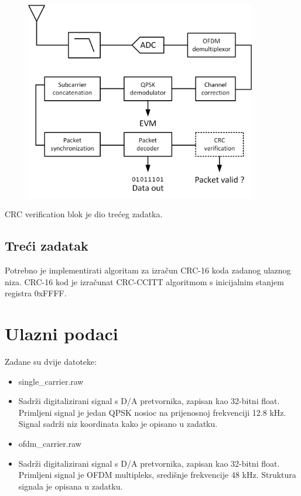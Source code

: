 \documentclass[a4paper]{article}
\begin{document}
\begin{figure}[h!]
\centering
\includegraphics[width=0.9\textwidth]{Task2.png}
\end{figure}

CRC verification blok je dio trećeg zadatka.

\subsection{Treći zadatak}
Potrebno je implementirati algoritam za izračun CRC-16 koda zadanog ulaznog niza. CRC-16 kod je izračunat CRC-CCITT algoritmom s inicijalnim stanjem registra 0xFFFF.

\section{Ulazni podaci}
Zadane su dvije datoteke:
\begin{itemize}
\item single\_carrier.raw
\item[] Sadrži digitalizirani signal s D/A pretvornika, zapisan kao 32-bitni float. Primljeni signal je jedan QPSK nosioc na prijenosnoj frekvenciji 12.8 kHz. Signal sadrži niz koordinata kako je opisano u zadatku.
\item ofdm\_carrier.raw
\item[] Sadrži digitalizirani signal s D/A pretvornika, zapisan kao 32-bitni float. Primljeni signal je OFDM multipleks, središnje frekvencije 48 kHz. Struktura signala je opisana u zadatku.
\end{itemize}
\end{document}
